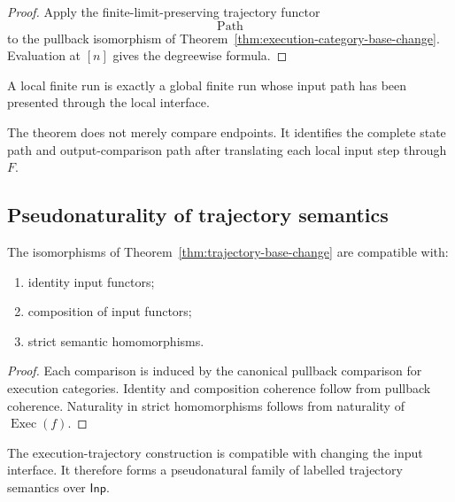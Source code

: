 \begin{proof}
Apply the finite-limit-preserving trajectory functor
\[
    \operatorname{Path}
\]
to the pullback isomorphism of
Theorem~\ref{thm:execution-category-base-change}.
Evaluation at \([n]\) gives the degreewise formula.
\end{proof}

\begin{remark}
\label{rem:operational-trajectory-base-change}
A local finite run is exactly a global finite run whose input path has been
presented through the local interface.

The theorem does not merely compare endpoints. It identifies the complete
state path and output-comparison path after translating each local input step
through \(F\).
\end{remark}

\subsection{Pseudonaturality of trajectory semantics}
\label{subsec:pseudonaturality-trajectory-semantics}

\begin{proposition}
\label{prop:pseudonaturality-trajectory-base-change}
The isomorphisms of
Theorem~\ref{thm:trajectory-base-change}
are compatible with:
\begin{enumerate}
    \item identity input functors;
    \item composition of input functors;
    \item strict semantic homomorphisms.
\end{enumerate}
\end{proposition}

\begin{proof}
Each comparison is induced by the canonical pullback comparison for execution
categories. Identity and composition coherence follow from pullback coherence.
Naturality in strict homomorphisms follows from naturality of
\(\operatorname{Exec}(f)\).
\end{proof}

\begin{remark}
\label{rem:indexed-temporal-semantics}
The execution-trajectory construction is compatible with changing the input
interface. It therefore forms a pseudonatural family of labelled trajectory
semantics over \(\mathsf{Inp}\).
\end{remark}

